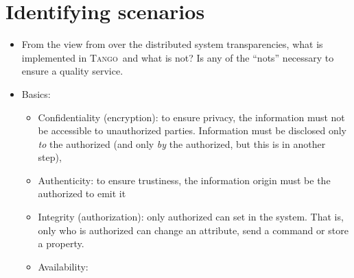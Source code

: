 \documentclass[10pt,a4paper,twoside]{llncs}
\newcommand{\tango}{\textsc{Tango}}
\begin{document}
%
\section{Identifying scenarios \label{sec:scenarios}}

\begin{itemize}
 \item From the view from \cite{TanenbaumDistr} over the distributed system transparencies, what is implemented in \tango\, and what is not? Is any of the ``nots'' necessary to ensure a quality service.
  \begin{table}
  \end{table}
 \item Basics:
 \begin{itemize}
  \item Confidentiality (encryption): to ensure privacy, the information must not be accessible to unauthorized parties. Information must be disclosed only \emph{to} the authorized (and only \emph{by} the authorized, but this is in another step),
  \item Authenticity: to ensure trustiness, the information origin must be the authorized to emit it
  \item Integrity (authorization): only authorized can set in the system. That is, only who is authorized can change an attribute, send a command or store a property.
  \item Availability:

\end{itemize}
\end{itemize}
\end{document}
